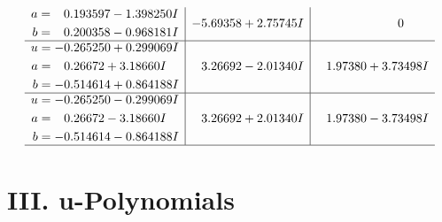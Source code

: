 \documentclass[1p]{elsarticle_modified}
\theoremstyle{definition}
\begin{document}
$$\begin{array}{c|c|c}
\begin{aligned}
a &= \phantom{-}0.193597 - 1.398250 I \\
b &= \phantom{-}0.200358 - 0.968181 I\end{aligned}
 & -5.69358 + 2.75745 I & \phantom{-0.000000 } 0 \\ \hline\begin{aligned}
u &= -0.265250 + 0.299069 I \\
a &= \phantom{-}0.26672 + 3.18660 I \\
b &= -0.514614 + 0.864188 I\end{aligned}
 & \phantom{-}3.26692 - 2.01340 I & \phantom{-}1.97380 + 3.73498 I \\ \hline\begin{aligned}
u &= -0.265250 - 0.299069 I \\
a &= \phantom{-}0.26672 - 3.18660 I \\
b &= -0.514614 - 0.864188 I\end{aligned}
 & \phantom{-}3.26692 + 2.01340 I & \phantom{-}1.97380 - 3.73498 I\\
 \hline 
 \end{array}$$\newpage
\newpage\renewcommand{\arraystretch}{1}
\centering \section*{ III. u-Polynomials}
\end{document}
